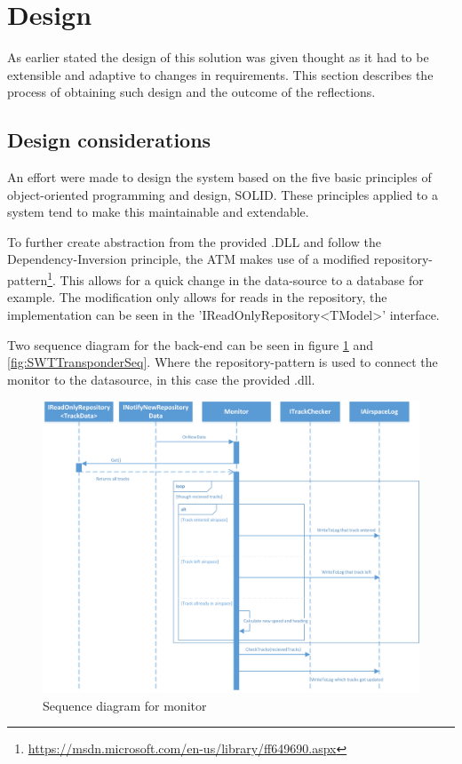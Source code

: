\section{Design}
As earlier stated the design of this solution was given thought as it had to be extensible and adaptive to changes in requirements. This section describes the process of obtaining such design and the outcome of the reflections.

\subsection{Design considerations}
An effort were made to design the system based on the five basic principles of object-oriented programming and design, SOLID. These principles applied to a system tend to make this maintainable and extendable.

To further create abstraction from the provided .DLL and follow the Dependency-Inversion principle, the ATM makes use of a modified repository-pattern\footnote{\url{https://msdn.microsoft.com/en-us/library/ff649690.aspx}}. This allows for a quick change in the data-source to a database for example.
The modification only allows for reads in the repository, the implementation can be seen in the 'IReadOnlyRepository<TModel>' interface.

Two sequence diagram for the back-end can be seen in figure \ref{fig:MonitorSeq} and \ref{fig:SWTTransponderSeq}. Where the repository-pattern is used to connect the monitor to the datasource, in this case the provided .dll.

\begin{figure}
	\centering
	\includegraphics[width=1.0\linewidth]{Images/MonitorSeq}
	\caption{Sequence diagram for monitor}
	\label{fig:MonitorSeq}
\end{figure}

